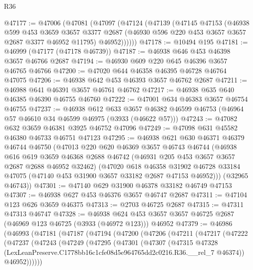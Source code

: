 \begin{lexlean}{R36}
\begin{coremodule}
@47177 := @47006
    (@47081
      (@47097
        (@47124
          (@47139
            (@47145
              @47153
              (@46938
                @599
                @453
                @3659
                @3657
                @3377
                @2687
                (@46930 @596 @220 @453 @3657 @3657 @2687 @3377 @46952 @11795)
                @46952))))))
@47178 := @10494 @195
@47181 := @46999 (@47177 (@47178 @46739))
@47187 := @46938 @646 @453 @46398 @3657 @46766 @2687
@47194 := @46930 @609 @220 @645 @46396 @3657 @46765 @46766
@47200 := @47020 @644 @46358 @46395 @46728 @46764 @47075
@47206 := @46938 @642 @453 @46393 @3657 @46762 @2687
@47211 := @46988 @641 @46391 @3657 @46761 @46762
@47217 := @46938 @635 @640 @46385 @46390 @46755 @46760
@47222 := @47001 @634 @46383 @3657 @46754 @46755
@47237 := @46938
    @612
    @633
    @3657
    @46382
    @46599
    @46753
    (@46964 @57 @46610 @34 @46599 @46975 (@3933 (@46622 @57)))
@47243 := @47082 @632 @3659 @46381 @3925 @46752 @47096
@47249 := @47098 @631 @45582 @46380 @46733 @46751 @47123
@47295 := @46938
    @621
    @630
    @46371
    @46379
    @46744
    @46750
    (@47013
      @220
      @620
      @46369
      @3657
      @46743
      @46744
      (@46938
        @616
        @619
        @3659
        @46368
        @2688
        @46742
        (@46931 @205 @453 @3657 @3657 @2687 @2688 @46952 @32462)
        (@47020
          @618
          @46358
          @31902
          @46728
          @33184
          @47075
          (@47140 @453 @31900 @3657 @33182 @2687 @47153 @46952)))
      (@32965 @46743))
@47301 := @47140 @629 @31900 @46378 @33182 @46749 @47153
@47307 := @46938 @627 @453 @46376 @3657 @46747 @2687
@47311 := @47104 @123 @626 @3659 @46375
@47313 := @2703 @46725 @2687
@47315 := @47311 @47313 @46747
@47328 := @46938
    @624
    @453
    @3657
    @3657
    @46725
    @2687
    (@46969 @123 @46725 (@3933 (@46972 @123)))
    @46952
@47379 := @46986
    (@46993
      (@47181
        (@47187
          (@47194
            (@47200
              (@47206
                (@47211
                  (@47217
                    (@47222
                      (@47237
                        (@47243
                          (@47249
                            (@47295
                              (@47301
                                (@47307
                                  (@47315
                                    @47328
                                    (LexLeanPreserve.C1778bb16c1cfe08d5e964765dd2c0216.R36.__rel_7
                                      @46374))
                                  @46952))))))

\end{coremodule}
\end{lexlean}
